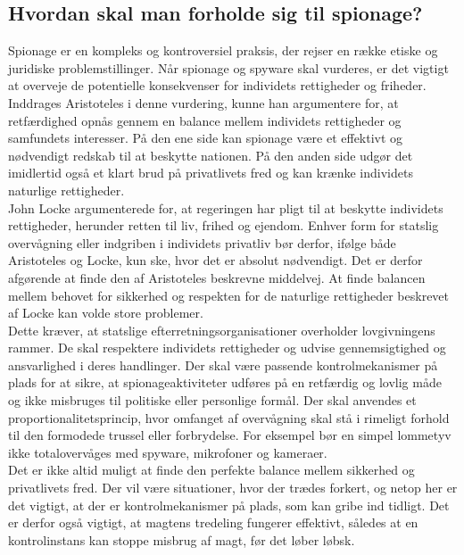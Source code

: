 \subsection{Hvordan skal man forholde sig til spionage?}
Spionage er en kompleks og kontroversiel praksis, der rejser en række etiske og juridiske problemstillinger. Når spionage og spyware skal vurderes, er det vigtigt at overveje de potentielle konsekvenser for individets rettigheder og friheder. Inddrages Aristoteles i denne vurdering, kunne han argumentere for, at retfærdighed opnås gennem en balance mellem individets rettigheder og samfundets interesser. På den ene side kan spionage være et effektivt og nødvendigt redskab til at beskytte nationen. På den anden side udgør det imidlertid også et klart brud på privatlivets fred og kan krænke individets naturlige rettigheder. \\John Locke argumenterede for, at regeringen har pligt til at beskytte individets rettigheder, herunder retten til liv, frihed og ejendom. Enhver form for statslig overvågning eller indgriben i individets privatliv bør derfor, ifølge både Aristoteles og Locke, kun ske, hvor det er absolut nødvendigt. Det er derfor afgørende at finde den af Aristoteles beskrevne middelvej. At finde balancen mellem behovet for sikkerhed og respekten for de naturlige rettigheder beskrevet af Locke kan volde store problemer. \\ Dette kræver, at statslige efterretningsorganisationer overholder lovgivningens rammer. De skal respektere individets rettigheder og udvise gennemsigtighed og ansvarlighed i deres handlinger. Der skal være passende kontrolmekanismer på plads for at sikre, at spionageaktiviteter udføres på en retfærdig og lovlig måde og ikke misbruges til politiske eller personlige formål. Der skal anvendes et proportionalitetsprincip, hvor omfanget af overvågning skal stå i rimeligt forhold til den formodede trussel eller forbrydelse. For eksempel bør en simpel lommetyv ikke totalovervåges med spyware, mikrofoner og kameraer.\\ Det er ikke altid muligt at finde den perfekte balance mellem sikkerhed og privatlivets fred. Der vil være situationer, hvor der trædes forkert, og netop her er det vigtigt, at der er kontrolmekanismer på plads, som kan gribe ind tidligt. Det er derfor også vigtigt, at magtens tredeling fungerer effektivt, således at en kontrolinstans kan stoppe misbrug af magt, før det løber løbsk.

